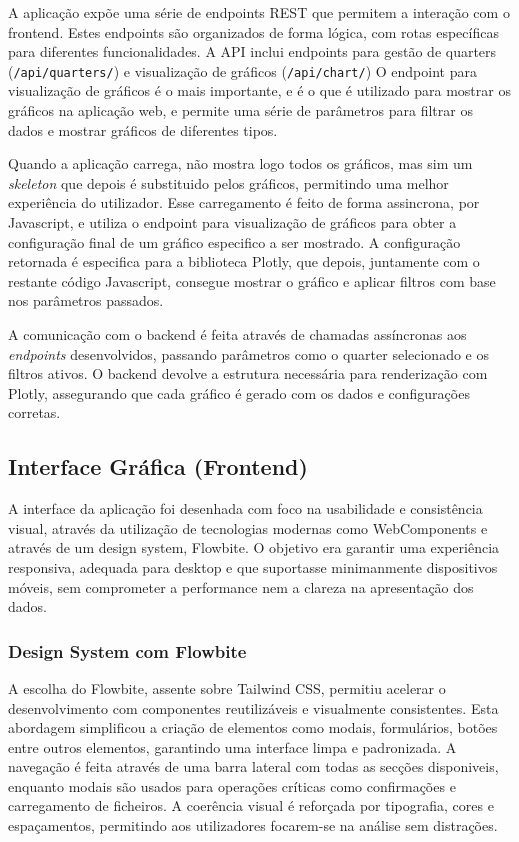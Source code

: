A aplicação expõe uma série de endpoints REST que permitem a interação com o frontend. Estes endpoints são organizados de forma lógica, com rotas específicas para diferentes funcionalidades. A API inclui endpoints para gestão de quarters (\texttt{/api/quarters/}) e visualização de gráficos (\texttt{/api/chart/})  O endpoint para visualização de gráficos é o mais importante, e é o que é utilizado para mostrar os gráficos na aplicação web, e permite uma série de parâmetros para filtrar os dados e mostrar gráficos de diferentes tipos. 

Quando a aplicação carrega, não mostra logo todos os gráficos, mas sim um \textit{skeleton} que depois é substituido pelos gráficos, permitindo uma melhor experiência do utilizador. Esse carregamento é feito de forma assincrona, por Javascript, e utiliza o endpoint para visualização de gráficos para obter a configuração final de um gráfico especifico a ser mostrado. A configuração retornada é especifica para a biblioteca Plotly, que depois, juntamente com o restante código Javascript, consegue mostrar o gráfico e aplicar filtros com base nos parâmetros passados.

A comunicação com o backend é feita através de chamadas assíncronas aos \textit{endpoints} desenvolvidos, passando parâmetros como o quarter selecionado e os filtros ativos. O backend devolve a estrutura necessária para renderização com Plotly, assegurando que cada gráfico é gerado com os dados e configurações corretas.

\subsection{Interface Gráfica (Frontend)}

A interface da aplicação foi desenhada com foco na usabilidade e consistência visual, através da utilização de tecnologias modernas como WebComponents e através de um design system, Flowbite. O objetivo era garantir uma experiência responsiva, adequada para desktop e que suportasse minimanmente dispositivos móveis, sem comprometer a performance nem a clareza na apresentação dos dados.

\subsubsection{Design System com Flowbite}

A escolha do Flowbite, assente sobre Tailwind CSS, permitiu acelerar o desenvolvimento com componentes reutilizáveis e visualmente consistentes. Esta abordagem simplificou a criação de elementos como modais, formulários, botões entre outros elementos, garantindo uma interface limpa e padronizada. A navegação é feita através de uma barra lateral com todas as secções disponiveis, enquanto modais são usados para operações críticas como confirmações e carregamento de ficheiros. A coerência visual é reforçada por tipografia, cores e espaçamentos, permitindo aos utilizadores focarem-se na análise sem distrações.

